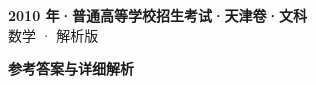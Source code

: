 \documentclass[zihao=-4, a4paper]{ctexart}
\begin{document}
\begin{center}
  {\Large\bfseries 2010 年·普通高等学校招生考试·天津卷·文科}\\[4pt]
  {\large 数学 · 解析版}
\end{center}
\medskip
{}

\clearpage
{}
\begin{center}{\Large\bfseries 参考答案与详细解析}\end{center}
\medskip

\end{document}
